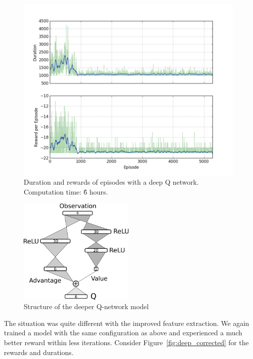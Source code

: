 \documentclass[10pt,a4paper]{article}
\begin{document}
\begin{figure}[!ht]
  \centering
  \includegraphics[width=1\textwidth]{./figures/long_trial.png}
  \caption{Duration and rewards of episodes with a deep Q network. Computation time: \~6 hours.}
  \label{fig:deepq_pong_duration}
\end{figure}

\begin{figure}[!ht]
  \centering
  \includegraphics[width=0.5\textwidth]{./figures/deep_relu.png}
  \caption{Structure of the deeper Q-network model}
  \label{fig:deepq_relu_structure}
\end{figure}

\FloatBarrier

The situation was quite different with the improved feature extraction. We again trained a model with the same configuration as above and experienced a much better reward within less iterations. Consider Figure~\ref{fig:deep_corrected} for the rewards and durations.
\end{document}

